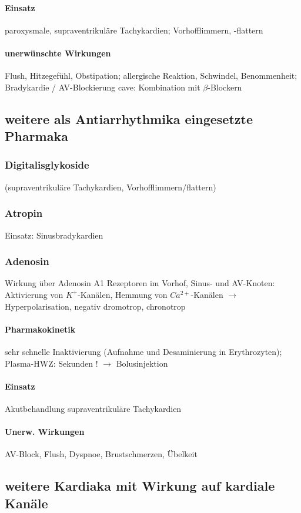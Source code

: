 \documentclass[10pt,a4paper]{report}
\begin{document}
\paragraph{Einsatz}  paroxysmale, supraventrikuläre Tachykardien; Vorhofflimmern, -flattern

\paragraph{unerwünschte Wirkungen}Flush, Hitzegefühl, Obstipation; allergische Reaktion, Schwindel, Benommenheit; Bradykardie / AV-Blockierung cave: Kombination mit $\beta$-Blockern

\subsection{weitere als Antiarrhythmika eingesetzte Pharmaka}
\subsubsection{Digitalisglykoside}  (supraventrikuläre Tachykardien, Vorhofflimmern/flattern)
\subsubsection{Atropin}  Einsatz: Sinusbradykardien
\subsubsection{Adenosin}  Wirkung über Adenosin A1 Rezeptoren im Vorhof, Sinus- und AV-Knoten: Aktivierung von $K^+$-Kanälen, Hemmung von $Ca^{2+}$-Kanälen $\rightarrow$ Hyperpolarisation, negativ dromotrop, chronotrop
\paragraph{Pharmakokinetik} sehr schnelle Inaktivierung (Aufnahme und Desaminierung in Erythrozyten); Plasma-HWZ: Sekunden ! $\rightarrow$ Bolusinjektion
\paragraph{Einsatz} Akutbehandlung supraventrikuläre Tachykardien
\paragraph{Unerw. Wirkungen} AV-Block, Flush, Dyspnoe, Brustschmerzen, Übelkeit

\subsection{weitere Kardiaka mit Wirkung auf kardiale Kanäle}
\end{document}

